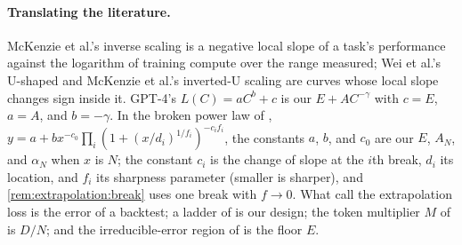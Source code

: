 \begin{refsection}
\paragraph{Translating the literature.} McKenzie et al.'s inverse scaling is a negative local slope of a task's performance against the logarithm of training compute over the range measured; Wei et al.'s U-shaped and McKenzie et al.'s inverted-U scaling are curves whose local slope changes sign inside it. GPT-4's $L(C)=aC^b+c$ is our $E+AC^{-\gamma}$ with $c=E$, $a=A$, and $b=-\gamma$. In the broken power law of \textcite{CaballeroEtAl2023}, $y=a+bx^{-c_0}\prod_i(1+(x/d_i)^{1/f_i})^{-c_if_i}$, the constants $a$, $b$, and $c_0$ are our $E$, $A_N$, and $\alpha_N$ when $x$ is $N$; the constant $c_i$ is the change of slope at the $i$th break, $d_i$ its location, and $f_i$ its sharpness parameter (smaller is sharper), and \cref{rem:extrapolation:break} uses one break with $f\to0$. What \textcite{AlabdulmohsinNeyshaburZhai2022} call the extrapolation loss is the error of a backtest; a ladder of \textcite{BhagiaEtAl2025} is our design; the token multiplier $M$ of \textcite{GadreEtAl2025} is $D/N$; and the irreducible-error region of \textcite{HestnessEtAl2017} is the floor $E$.

\printchapterbib
\end{refsection}
